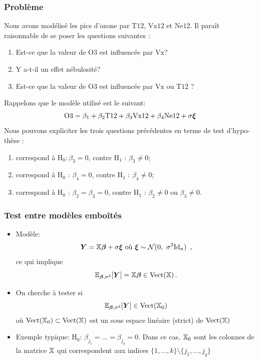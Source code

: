 \begin{frame}
\frametitle{Problème}
Nous avons modélisé les pics d'ozone par $\mathrm{T12}$, $\mathrm{Vx12}$ et $\mathrm{Ne12}$.
Il para\^{i}t raisonnable de se poser les questions suivantes :
\begin{enumerate}
\item Est-ce que la valeur de $\mathrm{O3}$ est influenc\'{e}e par $\mathrm{Vx}$?
\item Y a-t-il un effet n\'{e}bulosit\'{e}?
\item Est-ce que la valeur de $\mathrm{O3}$ est influenc\'{e}e par $\mathrm{Vx}$ ou $\mathrm{T12}$ ?
\end{enumerate}
Rappelons que le mod\`{e}le utilis\'{e} est le suivant:
\[
\mathrm{O3}= \beta_1 + \beta_2 \mathrm{T12} + \beta_3 \mathrm{Vx12} + \beta_4 \mathrm{Ne12} + \sigma \boldsymbol{\xi}
\]
Nous pouvons expliciter les trois questions pr\'{e}c\'{e}dentes en terme de test d'hypo- th\`{e}se :
\begin{enumerate}
\item correspond \`{a} $\mathrm{H}_{0}:\beta_{3}=0$, contre $\mathrm{H}_{1}$ : $\beta_{3}\neq 0$;
\item  correspond \`{a} $\mathrm{H}_{0}$ : $\beta_{4}=0$, contre $\mathrm{H}_{1}$ : $\beta_{4}\neq 0$;
\item correspond \`{a} $\mathrm{H}_{0}$ : $\beta_{2}=\beta_{3}=0$, contre $\mathrm{H}_{1}$ : $\beta_{2}\neq 0$ ou $\beta_{3}\neq 0$.
\end{enumerate}
\end{frame}

\begin{frame}
\frametitle{Test entre mod\`{e}les embo\^{i}t\'{e}s}
\begin{itemize}
\item \alert{Modèle}:
$$
\text{
$\operatorname{\boldsymbol{Y}}=\mathbb{X}\boldsymbol{\beta}+ \sigma \boldsymbol{\xi}$ o\`{u} $\boldsymbol{\xi} \sim \mathcal{N}(0,\ \sigma^{2}\mathrm{Id}_{n})$ \,,
}
$$
ce qui implique
$$ \operatorname{{\mathbb E}}_{\boldsymbol{\beta},\sigma^2}[\operatorname{\boldsymbol{Y}}]= \mathbb{X} \boldsymbol{\beta} \in \mathrm{Vect}(\mathbb{X}) \,.
$$
\item On cherche à tester si
$$\operatorname{{\mathbb E}}_{\boldsymbol{\beta},\sigma^2}[\operatorname{\boldsymbol{Y}}] \in \mathrm{Vect}(\mathbb{X}_0)
$$
où $\mathrm{Vect}(\mathbb{X}_0) \subset \mathrm{Vect}(\mathbb{X})$ est un sous espace linéaire (strict) de $\mathrm{Vect}(\mathbb{X})$
\item \alert{Exemple typique:} $\mathrm{H}_0$: $\beta_{j_1} = \dots = \beta_{j_q}= 0$. Dans ce cas, $\mathbb{X}_0$ sont les colonnes
de la matrice $\mathbb{X}$ qui correspondent aux indices $\{1,\dots,k\} \setminus \{j_1,\dots,j_q\}$
\end{itemize}
\end{frame}


